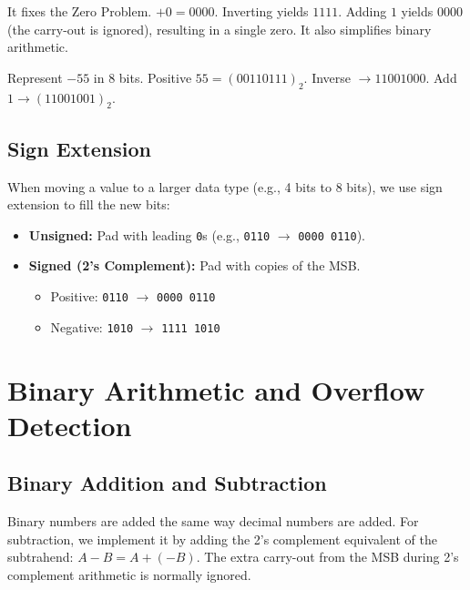 \begin{proposition}
It fixes the Zero Problem. $+0 = 0000$. Inverting yields $1111$. Adding $1$ yields $0000$ (the carry-out is ignored), resulting in a single zero. It also simplifies binary arithmetic.
\end{proposition}

\begin{example}[2's Complement]
Represent $-55$ in 8 bits. Positive $55 = (0011 0111)_2$. Inverse $\rightarrow 1100 1000$. Add $1 \rightarrow (1100 1001)_2$.
\end{example}

\subsection{Sign Extension}

When moving a value to a larger data type (e.g., 4 bits to 8 bits), we use sign extension to fill the new bits:

\begin{itemize}
    \item \textbf{Unsigned:} Pad with leading \texttt{0}s (e.g., \texttt{0110} $\rightarrow$ \texttt{0000 0110}).
    \item \textbf{Signed (2's Complement):} Pad with copies of the MSB.

    \begin{itemize}
        \item Positive: \texttt{0110} $\rightarrow$ \texttt{0000 0110}
        \item Negative: \texttt{1010} $\rightarrow$ \texttt{1111 1010}
    \end{itemize}

\end{itemize}

\section{Binary Arithmetic and Overflow Detection}

\subsection{Binary Addition and Subtraction}

Binary numbers are added the same way decimal numbers are added.
For subtraction, we implement it by adding the 2's complement equivalent of the subtrahend: $A - B = A + (-B)$. The extra carry-out from the MSB during 2's complement arithmetic is normally ignored.

